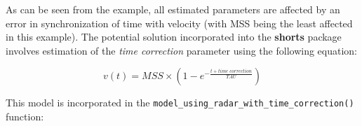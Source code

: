 \documentclass[fleqn,10pt]{wlpeerj} %
\newenvironment{Shaded}{\begin{snugshade}}{\end{snugshade}}
\newcommand{\AttributeTok}[1]{\textcolor[rgb]{0.77,0.63,0.00}{#1}}
\newcommand{\CommentTok}[1]{\textcolor[rgb]{0.56,0.35,0.01}{\textit{#1}}}
\newcommand{\FunctionTok}[1]{\textcolor[rgb]{0.00,0.00,0.00}{#1}}
\newcommand{\NormalTok}[1]{#1}
\newcommand{\OtherTok}[1]{\textcolor[rgb]{0.56,0.35,0.01}{#1}}
\newcommand{\SpecialCharTok}[1]{\textcolor[rgb]{0.00,0.00,0.00}{#1}}
\newcommand{\StringTok}[1]{\textcolor[rgb]{0.31,0.60,0.02}{#1}}
\begin{document}
\normalsize

As can be seen from the example, all estimated parameters are affected by an error in synchronization of time with velocity (with MSS being the least affected in this example). The potential solution incorporated into the \textbf{shorts} package involves estimation of the \emph{time correction} parameter using the following equation:

\begin{equation}
  v(t) = MSS \times (1 - e^{-\frac{t + time \; correction}{TAU}}) \label{eq:velocity-time-correction}
\end{equation}

This model is incorporated in the \texttt{model\_using\_radar\_with\_time\_correction()} function:

\small

\begin{Shaded}
\end{Shaded}
\end{document}
